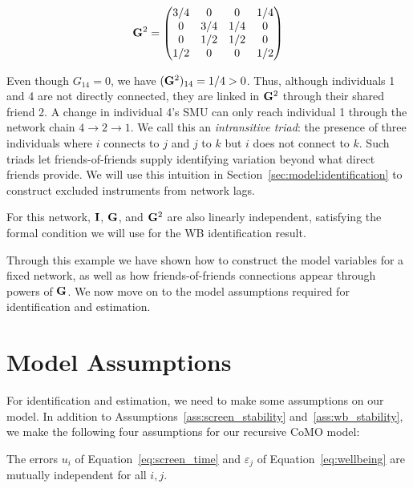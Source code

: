 \begin{equation}
    \mathbf{G}^2 = \begin{pmatrix}
        3/4 & 0 & 0 & 1/4 \\
        0 & 3/4 & 1/4 & 0 \\
        0 & 1/2 & 1/2 & 0 \\
        1/2 & 0 & 0 & 1/2
    \end{pmatrix}
\end{equation}

Even though $G_{14} = 0$, we have $(\mathbf{G}^2)_{14} = 1/4 > 0$. Thus, although individuals 1 and 4 are not directly connected, they are linked in $\mathbf{G}^2$ through their shared friend 2. A change in individual 4's SMU can only reach individual 1 through the network chain $4 \to 2 \to 1$. We call this an \emph{intransitive triad}: the presence of three individuals where $i$ connects to $j$ and $j$ to $k$ but $i$ does not connect to $k$. Such triads let friends-of-friends supply identifying variation beyond what direct friends provide. We will use this intuition in Section~\ref{sec:model:identification} to construct excluded instruments from network lags.

For this network, $\mathbf{I}$, $\mathbf{G}$, and $\mathbf{G}^2$ are also linearly independent, satisfying the formal condition we will use for the WB identification result.

Through this example we have shown how to construct the model variables for a fixed network, as well as how friends-of-friends connections appear through powers of $\mathbf{G}$. We now move on to the model assumptions required for identification and estimation.

\section{Model Assumptions}
\label{sec:model:assumptions}
For identification and estimation, we need to make some assumptions on our model. In addition to Assumptions~\ref{ass:screen_stability} and~\ref{ass:wb_stability}, we make the following four assumptions for our recursive CoMO model:

\begin{assumption}
\label{ass:error_indep}
The errors $u_i$ of Equation~\eqref{eq:screen_time} and $\varepsilon_j$ of Equation~\eqref{eq:wellbeing} are mutually independent for all
$i, j$.
\end{assumption}

